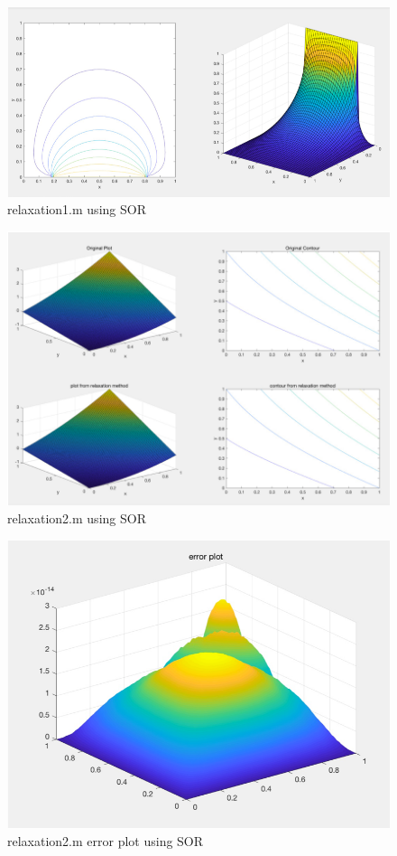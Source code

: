 \documentclass[11pt, oneside, titlepage]{article}   	%
\begin{document}
\begin{figure}[H]
	\includegraphics[width = \textwidth]{SOR_1}
	\caption{relaxation1.m using SOR} \label{fig:SOR_1}
\end{figure}

\begin{figure}[H]
	\includegraphics[width = \textwidth]{SOR_2}
	\caption{relaxation2.m using SOR} \label{fig:SOR_2}
\end{figure}

\begin{figure}[H]
	\includegraphics[width = \textwidth]{SOR_3}
	\caption{relaxation2.m error plot using SOR} \label{fig:SOR_3}
\end{figure}
\end{document}
